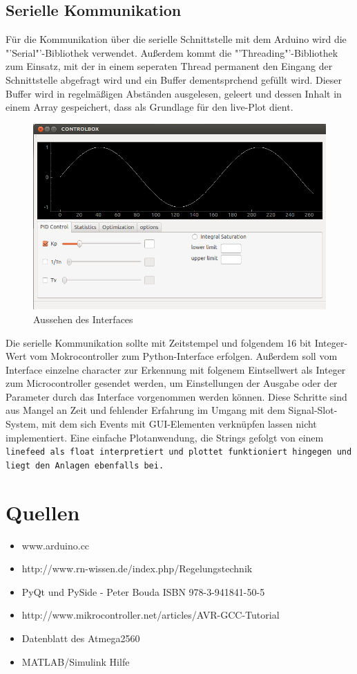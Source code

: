 \documentclass[a4paper]{report}
\begin{document}
\section{Serielle Kommunikation}
F\"ur die Kommunikation \"uber die serielle Schnittstelle mit dem Arduino wird die "'Serial"'-Bibliothek verwendet. Au{\ss}erdem kommt die "'Threading"'-Bibliothek zum Einsatz, mit der in einem seperaten Thread permanent den Eingang der Schnittstelle abgefragt wird und ein Buffer dementsprchend gef\"ullt wird. Dieser Buffer wird in regelm\"a{\ss}igen Abst\"anden ausgelesen, geleert und dessen Inhalt in einem Array gespeichert, dass als Grundlage f\"ur den live-Plot dient.
\begin{figure}[h]
\includegraphics[width=\textwidth]{img/interfacewindow.png}
\caption{Aussehen des Interfaces}
\end{figure}
Die serielle Kommunikation sollte mit Zeitstempel und folgendem 16 bit Integer-Wert vom Mokrocontroller zum Python-Interface erfolgen. Au{\ss}erdem soll vom Interface einzelne character zur Erkennung mit folgenem Eintsellwert als Integer zum Microcontroller gesendet werden, um Einstellungen der Ausgabe oder der Parameter durch das Interface vorgenommen werden k\"onnen. Diese Schritte sind aus Mangel an Zeit und fehlender Erfahrung im Umgang mit dem Signal-Slot-System, mit dem sich Events mit GUI-Elementen verkn\"upfen lassen nicht implementiert. Eine einfache Plotanwendung, die Strings gefolgt von einem \tt linefeed \rm als \tt float \rm  interpretiert und plottet funktioniert hingegen und liegt den Anlagen ebenfalls bei.
\chapter{Quellen}
\begin{itemize}
\item www.arduino.cc
\item http://www.rn-wissen.de/index.php/Regelungstechnik
\item PyQt und PySide - Peter Bouda ISBN 978-3-941841-50-5
\item http://www.mikrocontroller.net/articles/AVR-GCC-Tutorial
\item Datenblatt des Atmega2560
\item MATLAB/Simulink Hilfe
\end{itemize}	  
\end{document}
